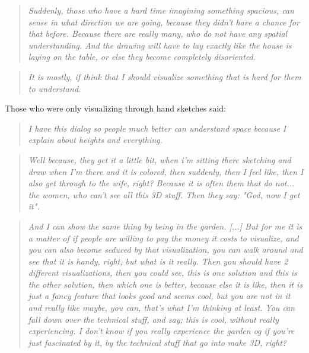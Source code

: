 		\begin{quote}
			\textit{Suddenly, those who have a hard time imagining something spacious, can sense in what direction we are going, because they didn't have a chance for that before. Because there are really many, who do not have any spatial understanding. And the drawing will have to lay exactly like the house is laying on the table, or else they become completely disoriented}\label{quote:expertRoom1}.\\
		\end{quote}
	
		\begin{quote}
			\textit{It is mostly, if think that I should visualize something that is hard for them to understand.}\label{quote:expertRoom2}\\
		\end{quote}

		Those who were only visualizing through hand sketches said:\\	
		\begin{quote}
			\textit{I have this dialog so people much better can understand space because I explain about heights and everything.}\label{quote:expertRoom3}\\
		\end{quote}
	
		\begin{quote}
			\textit{Well because, they get it a little bit, when i'm sitting there sketching and draw when I'm there and it is colored, then suddenly, then I feel like, then I also get through to the wife, right? Because it is often them that do not... the women, who can't see all this 3D stuff. Then they say: "God, now I get it".}\label{quote:expertRoom4}\\
		\end{quote}
	
		\begin{quote}
			\textit{And I can show the same thing by being in the garden. [...] But for me it is a matter of if people are willing to pay the money it costs to visualize, and you can also become seduced by that visualization, you can walk around and see that it is handy, right, but what is it really. Then you should have 2 different visualizations, then you could see, this is one solution and this is the other solution, then which one is better, because else it is like, then it is just a fancy feature that looks good and seems cool, but you are not in it and really like maybe, you can, that's what I'm thinking at least. You can fall down over the technical stuff, and say; this is cool, without really experiencing. I don't know if you really experience the garden og if you're just fascinated by it, by the technical stuff that go into make 3D, right?}\label{quote:expertRoom5}\\
		\end{quote}
		
